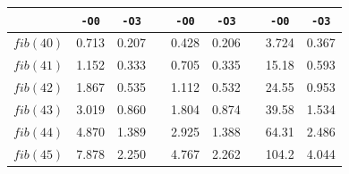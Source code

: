 \begin{table}
{\begin{minipage}{0.7\textwidth}
\begin{tabular}{@{}lcccccccc@{}}
                \cmidrule{2-3} \cmidrule{5-6} \cmidrule{8-9}
                          & \texttt{-O0}                & \texttt{-O3} &                       & \texttt{-O0} & \texttt{-O3}                &  & \texttt{-O0} & \texttt{-O3} \\ \midrule
                $fib(40)$ & 0.713                       & 0.207        &                       & 0.428        & 0.206                       &  & 3.724        & 0.367        \\
                $fib(41)$ & 1.152                       & 0.333        &                       & 0.705        & 0.335                       &  & 15.18        & 0.593        \\
                $fib(42)$ & 1.867                       & 0.535        &                       & 1.112        & 0.532                       &  & 24.55        & 0.953        \\
                $fib(43)$ & 3.019                       & 0.860        &                       & 1.804        & 0.874                       &  & 39.58        & 1.534        \\
                $fib(44)$ & 4.870                       & 1.389        &                       & 2.925        & 1.388                       &  & 64.31        & 2.486        \\
                $fib(45)$ & 7.878                       & 2.250        &                       & 4.767        & 2.262                       &  & 104.2        & 4.044        \\
                \bottomrule
            \end{tabular}%
        \end{minipage}%
    }%
\end{table}


